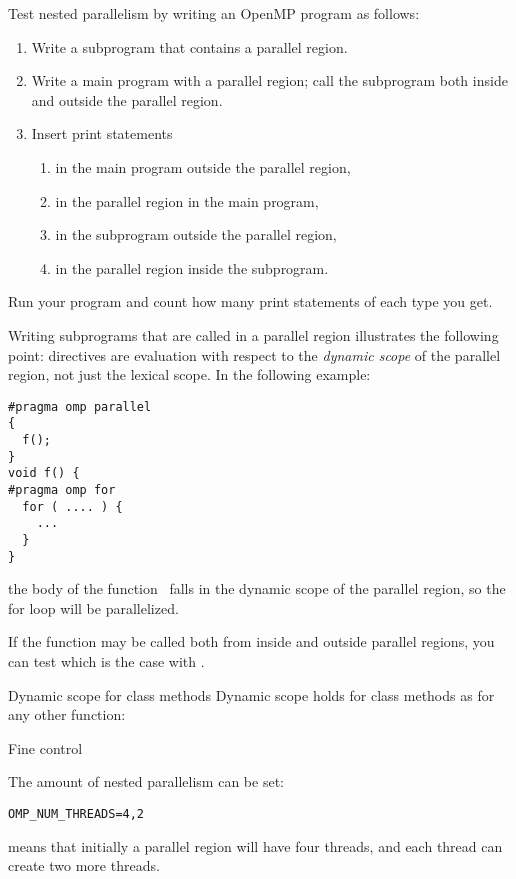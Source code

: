 \begin{exercise}
  Test nested parallelism by writing an OpenMP program as follows:
  \begin{enumerate}
  \item Write a subprogram that contains a parallel region.
  \item\label{ex:nest:sub} Write a main program with a parallel region; call the subprogram both inside and outside the parallel region.
    \item Insert print statements 
      \begin{enumerate}
      \item in the main program outside the parallel region,
      \item in the parallel region in the main program,
      \item\label{ex:nest:sub:sub} in the subprogram outside the parallel region,
      \item in the parallel region inside the subprogram.
      \end{enumerate}
  \end{enumerate}
  Run your program and count how many print statements of each type you get.
\end{exercise}

Writing subprograms that are called in a parallel region illustrates
the following point: directives are evaluation with respect to the
\emph{dynamic scope} of the
parallel region, not just the lexical scope. In the following example:
\begin{lstlisting}
#pragma omp parallel
{
  f();
}
void f() {
#pragma omp for
  for ( .... ) {
    ...
  }
}
\end{lstlisting}
the body of the function~ falls in the dynamic scope of the
parallel region, so the for loop will be parallelized.

If the function may be called both from inside and outside parallel
regions, you can test which is the case with .

\begin{cppnote}{Dynamic scope for class methods}
  Dynamic scope holds for class methods as for any other function:
\end{cppnote}

 {Fine control}

The amount of nested parallelism can be set:
\begin{verbatim}
OMP_NUM_THREADS=4,2
\end{verbatim}
means that initially a parallel region will have four threads, and
each thread can create two more threads.

